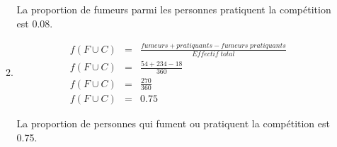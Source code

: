 \documentclass[12pt,a4paper]{article}
\begin{document}
\begin{enumerate}[label=\arabic*)]
\begin{enumerate}[label=\alph*)]
		La proportion de fumeurs parmi les personnes pratiquent la compétition est \num{0.08}.
		
		\item \begin{eqnarray*}
			f(F \cup C) &=& \frac{fumeurs + pratiquants - fumeurs\; pratiquants}{Effectif\; total} \\
			f(F \cup C) &=& \frac{54 + 234 - 18}{360} \\
			f(F \cup C) &=& \frac{270}{360} \\
			f(F \cup C) &=& \num{0.75}
		\end{eqnarray*}
		
		La proportion de personnes qui fument ou pratiquent la compétition est \num{0.75}.
	\end{enumerate}
	
\end{enumerate}
\end{document}
